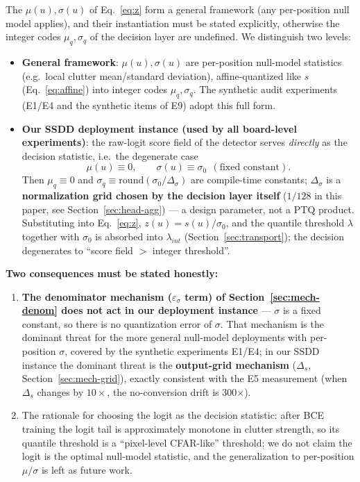 The $\mu(u),\sigma(u)$ of Eq.~\eqref{eq:z} form a general framework (any per-position null model applies), and their instantiation must be stated explicitly, otherwise the integer codes $\mu_q,\sigma_q$ of the decision layer are undefined.
We distinguish two levels:
\begin{itemize}
\item \textbf{General framework}: $\mu(u),\sigma(u)$ are per-position null-model statistics (e.g.\ local clutter mean/standard deviation), affine-quantized like $s$ (Eq.~\eqref{eq:affine}) into integer codes $\mu_q,\sigma_q$. The synthetic audit experiments (E1/E4 and the synthetic items of E9) adopt this full form.
\item \textbf{Our SSDD deployment instance (used by all board-level experiments)}: the raw-logit score field of the detector serves \emph{directly} as the decision statistic, i.e.\ the degenerate case
\begin{equation}
\mu(u)\equiv 0,\qquad \sigma(u)\equiv \sigma_{0}\ \ (\text{fixed constant}).
\tag{3.9a}
\label{eq:null-degenerate}
\end{equation}
Then $\mu_q\equiv0$ and $\sigma_q\equiv\mathrm{round}(\sigma_0/\Delta_\sigma)$ are compile-time constants; $\Delta_\sigma$ is a \textbf{normalization grid chosen by the decision layer itself} ($1/128$ in this paper, see Section~\ref{sec:head-agg}) --- a design parameter, not a PTQ product.
Substituting into Eq.~\eqref{eq:z}, $z(u)=s(u)/\sigma_0$, and the quantile threshold $\lambda$ together with $\sigma_0$ is absorbed into $\lambda_{int}$ (Section~\ref{sec:transport}); the decision degenerates to ``score field $>$ integer threshold''.
\end{itemize}

\textbf{Two consequences must be stated honestly:}
\begin{enumerate}
\item \textbf{The denominator mechanism ($\varepsilon_\sigma$ term) of Section~\ref{sec:mech-denom} does not act in our deployment instance} --- $\sigma$ is a fixed constant, so there is no quantization error of $\sigma$.
That mechanism is the dominant threat for the more general null-model deployments with per-position $\sigma$, covered by the synthetic experiments E1/E4; in our SSDD instance the dominant threat is the \textbf{output-grid mechanism} ($\Delta_s$, Section~\ref{sec:mech-grid}), exactly consistent with the E5 measurement (when $\Delta_s$ changes by $10\times$, the no-conversion drift is 300$\times$).
\item The rationale for choosing the logit as the decision statistic: after BCE training the logit tail is approximately monotone in clutter strength, so its quantile threshold is a ``pixel-level CFAR-like'' threshold; we do not claim the logit is the optimal null-model statistic, and the generalization to per-position $\mu/\sigma$ is left as future work.
\end{enumerate}

